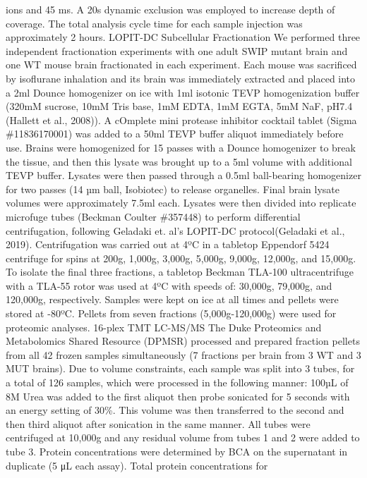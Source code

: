 ions and 45 ms. A 20s dynamic exclusion was employed to increase depth of
coverage. The total analysis cycle time for each sample injection was
approximately 2 hours. 
LOPIT-DC Subcellular Fractionation
We performed three independent fractionation experiments with one adult SWIP
mutant brain and one WT mouse brain fractionated in each experiment. Each mouse
was sacrificed by isoflurane inhalation and its brain was immediately extracted
and placed into a 2ml Dounce homogenizer on ice with 1ml isotonic TEVP
homogenization buffer (320mM sucrose, 10mM Tris base, 1mM EDTA, 1mM EGTA, 5mM
NaF, pH7.4 (Hallett et al., 2008)). A cOmplete mini protease inhibitor cocktail
tablet (Sigma \#11836170001) was added to a 50ml TEVP buffer aliquot immediately
before use. Brains were homogenized for 15 passes with a Dounce homogenizer to
break the tissue, and then this lysate was brought up to a 5ml volume with
additional TEVP buffer. Lysates were then passed through a 0.5ml ball-bearing
homogenizer for two passes (14 µm ball, Isobiotec) to release organelles. Final
brain lysate volumes were approximately 7.5ml each. Lysates were then divided
into replicate microfuge tubes (Beckman Coulter \#357448) to perform differential
centrifugation, following Geladaki et. al’s LOPIT-DC protocol(Geladaki et al.,
2019). Centrifugation was carried out at 4ºC in a tabletop Eppendorf 5424
centrifuge for spins at 200g, 1,000g, 3,000g, 5,000g, 9,000g, 12,000g, and
15,000g. To isolate the final three fractions, a tabletop Beckman TLA-100
ultracentrifuge with a TLA-55 rotor was used at 4ºC with speeds of: 30,000g,
79,000g, and 120,000g, respectively. Samples were kept on ice at all times and
pellets were stored at -80ºC. Pellets from seven fractions (5,000g-120,000g)
were used for proteomic analyses. 
16-plex TMT LC-MS/MS
The Duke Proteomics and Metabolomics Shared Resource (DPMSR) processed and
prepared fraction pellets from all 42 frozen samples simultaneously (7 fractions
per brain from 3 WT and 3 MUT brains). Due to volume constraints, each sample
was split into 3 tubes, for a total of 126 samples, which were processed in the
following manner: 100µL of 8M Urea was added to the first aliquot then probe
sonicated for 5 seconds with an energy setting of 30\%. This volume was then
transferred to the second and then third aliquot after sonication in the same
manner. All tubes were centrifuged at 10,000g and any residual volume from tubes
1 and 2 were added to tube 3. Protein concentrations were determined by BCA on
the supernatant in duplicate (5 μL each assay). Total protein concentrations for
